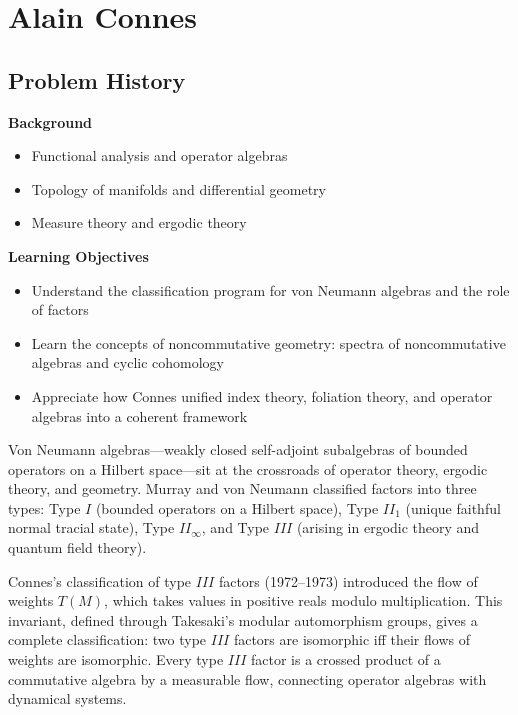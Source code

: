 \chapter{Alain Connes}

\section*{Problem History}

\begin{prereqs}
\noindent \textbf{Background}
\begin{itemize}
\item Functional analysis and operator algebras
\item Topology of manifolds and differential geometry
\item Measure theory and ergodic theory
\end{itemize}
\end{prereqs}

\begin{objectives}
\noindent \textbf{Learning Objectives}
\begin{itemize}
\item Understand the classification program for von Neumann algebras and the role of factors
\item Learn the concepts of noncommutative geometry: spectra of noncommutative algebras and cyclic cohomology
\item Appreciate how Connes unified index theory, foliation theory, and operator algebras into a coherent framework
\end{itemize}
\end{objectives}

Von Neumann algebras---weakly closed self-adjoint subalgebras of bounded
operators on a Hilbert space---sit at the crossroads of operator theory,
ergodic theory, and geometry. Murray and von Neumann classified factors
into three types: Type $I$ (bounded operators on a Hilbert space), Type
$II_1$ (unique faithful normal tracial state), Type $II_\infty$, and
Type $III$ (arising in ergodic theory and quantum field theory).

Connes's classification \cite{connes1985} of type $III$ factors (1972--1973) introduced the
flow of weights $T(M)$, which takes values in positive reals modulo
multiplication. This invariant, defined through Takesaki's modular
automorphism groups, gives a complete classification: two type $III$
factors are isomorphic iff their flows of weights are isomorphic. Every
type $III$ factor is a crossed product of a commutative algebra by a
measurable flow, connecting operator algebras with dynamical systems.

